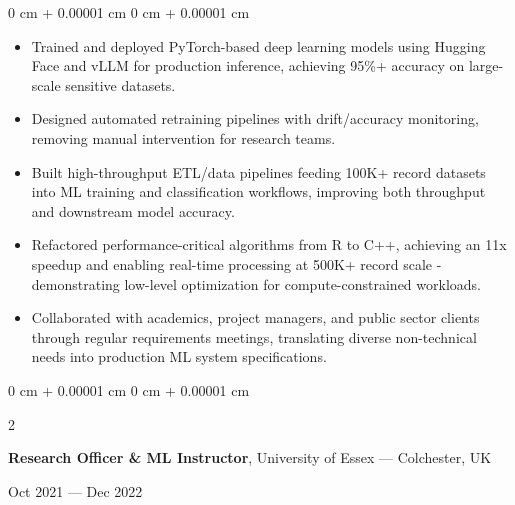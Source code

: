 \documentclass[6pt, letterpaper]{article}
\newenvironment{highlights}{
    \begin{itemize}[
        topsep=0.03 cm,
        parsep=0.03 cm,
        partopsep=0pt,
        itemsep=0pt,
        leftmargin=0 cm + 10pt
    ]
}{
    \end{itemize}
} %
\newenvironment{onecolentry}{
    \begin{adjustwidth}{
        0 cm + 0.00001 cm
    }{
        0 cm + 0.00001 cm
    }
}{
    \end{adjustwidth}
} %
\newenvironment{twocolentry}[2][]{
    \onecolentry
    \def\secondColumn{#2}
    \setcolumnwidth{\fill, 4.5 cm}
    \begin{paracol}{2}
}{
    \switchcolumn \raggedleft \secondColumn
    \end{paracol}
    \endonecolentry
} %
\begin{document}
        \begin{onecolentry}
        \begin{highlights}

            \item Trained and deployed PyTorch-based deep learning models using Hugging Face and vLLM for production inference, achieving 95\%+ accuracy on large-scale sensitive datasets.
            \item Designed automated retraining pipelines with drift/accuracy monitoring, removing manual intervention for research teams.
            \item Built high-throughput ETL/data pipelines feeding 100K+ record datasets into ML training and classification workflows, improving both throughput and downstream model accuracy.
            \item Refactored performance-critical algorithms from R to C++, achieving an 11x speedup and enabling real-time processing at 500K+ record scale - demonstrating low-level optimization for compute-constrained workloads.
            \item Collaborated with academics, project managers, and public sector clients through regular requirements meetings, translating diverse non-technical needs into production ML system specifications.

        \end{highlights}
        \end{onecolentry}

        \begin{twocolentry}{Oct 2021 --- Dec 2022}
        \textbf{Research Officer \& ML Instructor}, University of Essex --- Colchester, UK
        \end{twocolentry}
\end{document}
